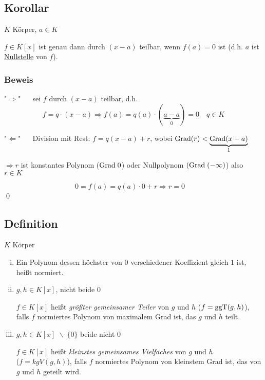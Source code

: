 \subsection{Korollar}

$K$ Körper, $a \in K$

$f \in K[x]$ ist genau dann durch $(x - a)$ teilbar, wenn $f(a) = 0$ ist (d.h. $a$ ist \underline{Nullstelle} von $f$).

\subsubsection*{Beweis}

"$\Rightarrow$" $\quad$ sei $f$ durch $(x - a)$ teilbar, d.h.
\[f = q \cdot (x - a) \Rightarrow f(a) = q(a) \cdot (\underbrace{a-a}_{0}) = 0 \quad q \in K\]

"$\Leftarrow$" $\quad$ Division mit Rest: $f = q(x - a) + r$, wobei
$\mathrm{ Grad }(r) < \underbrace{\mathrm{ Grad }(x-a)}_{1}$

$\Rightarrow r$ ist konstantes Polynom ($\mathrm{ Grad } \; 0$) oder Nullpolynom $(\mathrm{ Grad } \;(-\infty)$) also $r \in K$

\[0 = f(a) = q(a) \cdot 0 + r \Rightarrow r = 0 \quad \]
\qed

\subsection{Definition}

$K$ Körper

\begin{enumerate}[(i)]
	\item
	Ein Polynom dessen höchster von $0$ verschiedener Koeffizient gleich $1$ ist, heißt normiert.
	
	\item
	$g, h \in K[x]$, nicht beide $0$ 
	
	$f \in K[x]$ heißt \emph{größter gemeinsamer Teiler} von $g$ und $h$ ($f=\mathrm{ ggT }(g,h)$), falls
	$f$ normiertes Polynom von maximalem Grad ist, das $g$ und $h$ teilt.
	
	\item
	$g, h \in K[x] \;\backslash\; \{0\}$ beide nicht $0$
	
	$f \in K[x]$ heißt \emph{kleinstes gemeinsames Vielfaches} von $g$ und $h$\\ ($f = kgV(g,h)$), falls
	$f$ normiertes Polynom von kleinstem Grad ist, das von $g$ und $h$ geteilt wird.
\end{enumerate}


